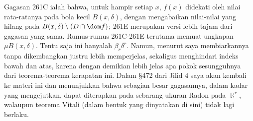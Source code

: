 {Gagasan 261C ialah bahwa, untuk hampir setiap $x$, $f(x)$ didekati oleh nilai 
rata-ratanya pada bola kecil $B(x,\delta)$, dengan mengabaikan nilai-nilai 
yang hilang pada $B(x,\delta)\setminus(D\cap\dom f)$; 261E merupakan versi 
lebih tajam dari gagasan yang sama. Rumus-rumus 261C-261E terutama memuat 
ungkapan $\mu B(x,\delta)$. Tentu saja ini hanyalah $\beta_r\delta^r$. Namun, 
menurut saya membiarkannya tanpa dikembangkan justru lebih memperjelas, 
sekaligus menghindari indeks bawah dan atas, karena dengan demikian lebih 
jelas apa pokok sesungguhnya dari teorema-teorema kerapatan ini. Dalam \S472 
dari Jilid 4 saya akan kembali ke materi ini dan menunjukkan bahwa sebagian 
besar gagasannya, dalam kadar yang mengejutkan, dapat diterapkan pada 
sebarang ukuran Radon pada $\BbbR^r$, walaupun teorema Vitali (dalam bentuk 
yang dinyatakan di sini) tidak lagi berlaku. 
      
}%
      
      
\discrpage 
      
